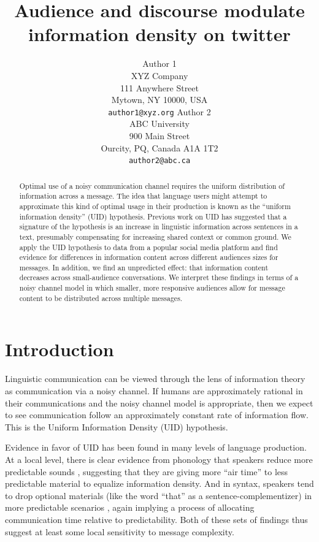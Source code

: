 \documentclass[11pt,letterpaper]{article}
\title{Audience and discourse modulate information density on twitter 
\Thanks{Thanks to...}}
\author{Author 1\\
XYZ Company\\
111 Anywhere Street\\
Mytown, NY 10000, USA\\
{\tt author1@xyz.org}
	  \And
          Author 2\\
ABC University\\
900 Main Street\\
Ourcity, PQ, Canada A1A 1T2\\
{\tt author2@abc.ca}
}
\date{}
\begin{document}
\maketitle
\begin{abstract}
Optimal use of a noisy communication channel requires the uniform distribution of information across a message. The idea that language users might attempt to approximate this kind of optimal usage in their production is known as the ``uniform information density'' (UID) hypothesis. Previous work on UID has suggested that a signature of the hypothesis is an  increase in linguistic information across sentences in a text, presumably compensating for increasing shared context or common ground. We apply the UID hypothesis to data from a popular social media platform and find evidence for differences in information content across different audiences sizes for messages. In addition, we find an unpredicted effect: that information content decreases across small-audience conversations. We interpret these findings in terms of a noisy channel model in which smaller, more responsive audiences allow for message content to be distributed across multiple messages. 


\end{abstract}

\section{Introduction}

Linguistic communication can be viewed through the lens of information theory as communication via a noisy channel.  If humans are approximately rational in their communications and the noisy channel model is appropriate, then we expect to see communication follow an approximately constant rate of information flow.  This is the Uniform Information Density (UID) hypothesis.

Evidence in favor of UID has been found in many levels of language production. At a local level, there is clear evidence from phonology that speakers reduce more predictable sounds \cite{aylett2004,aylett2006,bell2003}, suggesting that they are giving more ``air time'' to less predictable material to equalize information density. And in syntax, speakers tend to drop optional materials (like the word ``that'' as a sentence-complementizer) in more predictable scenarios \cite{levy2007,frank2008,jaeger2010}, again implying a process of allocating communication time relative to predictability. Both of these sets of findings thus suggest at least some local sensitivity to message complexity.
\end{document}
